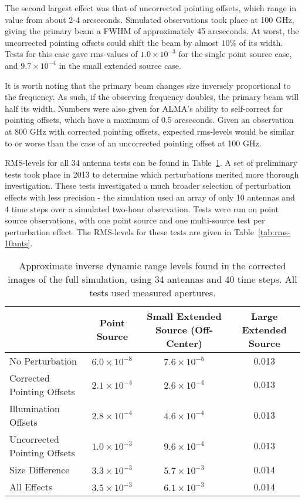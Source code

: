 \documentclass[11pt]{article}
\begin{document}
The second largest effect was that of uncorrected pointing offsets, which
range in value from about 2-4 arcseconds. Simulated observations took place
at 100 GHz, giving the primary beam a FWHM of approximately 45 arcseconds.
At worst, the uncorrected pointing offsets could shift the beam by almost
$10\%$ of its width. Tests for this case gave rms-values of $1.0 \times 
10^{-3}$ for the single point source case, and $9.7 \times 10^{-4}$ in the 
small extended source case.

It is worth noting that the primary beam changes size inversely proportional
to the frequency. As such, if the observing frequency doubles, the primary
beam will half its width. Numbers were also given for ALMA's ability to
self-correct for pointing offsets, which have a maximum of 0.5 arcseconds.
Given an observation at 800 GHz with corrected pointing offsets, expected 
rms-levels would be similar to or worse than the case of an uncorrected 
pointing offset at 100 GHz.

RMS-levels for all 34 antenna tests can be found in Table~\ref{tab:rms-34ants}.  
A set of preliminary tests took place in 2013 to determine which perturbations 
merited more thorough investigation. These tests investigated a much broader 
selection of perturbation effects with less precision - the simulation used an 
array of only 10 antennas and 4 time steps over a simulated two-hour 
observation. Tests were run on point source observations, with one point source 
and one multi-source test per perturbation effect. The RMS-levels for these 
tests are given in Table~\ref{tab:rms-10ants}.

\begin{table}
    \centering
    \begin{tabular}{|p{3.5cm}|c|c|c|}
    \hline
    & Point Source & Small Extended Source \linebreak (Off-Center) & Large 
    Extended Source \\
    \hline
    No Perturbation & $6.0 \times 10^{-8}$ & $7.6 \times 10^{-5}$ & 0.013 \\
    \hline
    Corrected Pointing \linebreak Offsets & $2.1 \times 10^{-4}$ & $2.6 \times 
    10^{-4}$ & 0.013 \\
    \hline
    Illumination \linebreak Offsets & $2.8 \times 10^{-4}$ & $4.6 \times 
    10^{-4}$ & 0.013 \\
    \hline
    Uncorrected \linebreak Pointing Offsets & $1.0 \times 10^{-3}$ & $9.6 
    \times 10^{-4}$ & 0.013\\
    \hline
    Size Difference & $3.3 \times 10^{-3}$ & $5.7 \times 10^{-3}$ & 0.014 \\
    \hline
    All Effects\footnotemark & $3.5 \times 10^{-3}$ & $6.1 \times 10^{-3}$ & 
    0.014 \\
    \hline
    \end{tabular}
    \caption{
         Approximate inverse dynamic range levels found in the corrected images 
         of the full simulation, using 34 antennas and 40 time steps. All tests 
         used measured apertures.
    }
    \label{tab:rms-34ants}
\end{table}
\end{document}

